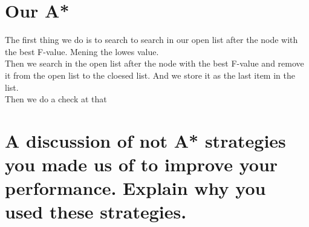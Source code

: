 \documentclass[12pt, a4paper]{article}
\begin{document}
\section{Our A*}
The first thing we do is to search to search in our open list after the node with the best F-value. Mening the lowes value.\\
Then we search in the open list after the node with the best F-value and remove it from the open list to the cloesed list. And we store it as the last item in the list.\\
Then we do a check at that 




\section{A discussion of not A* strategies you made us of to improve your performance. Explain why you used these strategies.}
\end{document}
